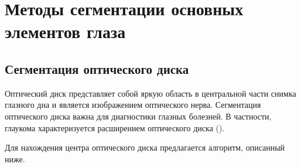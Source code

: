 \documentclass[12pt,fleqn]{article}
\begin{document}

\section{Методы сегментации основных элементов глаза}

\subsection{Сегментация оптического диска}
\label{section:optic_disk}
Оптический диск представляет собой яркую область в центральной части снимка глазного дна и является изображением оптического нерва. Сегментация оптического диска важна для диагностики глазных болезней. В частности, глаукома характеризуется расширением оптического диска (\cite[стр. 13]{book_opthalmology}).

Для нахождения центра оптического диска предлагается алгоритм, описанный ниже.
\end{document}
